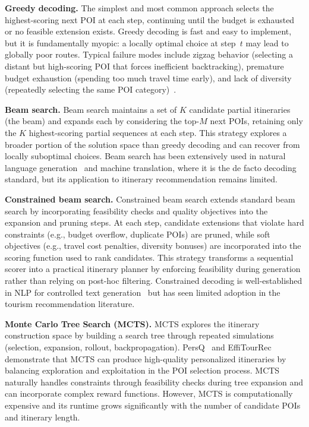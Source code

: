 \textbf{Greedy decoding.} The simplest and most common approach selects the highest-scoring next POI at each step, continuing until the budget is exhausted or no feasible extension exists. Greedy decoding is fast and easy to implement, but it is fundamentally myopic: a locally optimal choice at step~$t$ may lead to globally poor routes. Typical failure modes include zigzag behavior (selecting a distant but high-scoring POI that forces inefficient backtracking), premature budget exhaustion (spending too much travel time early), and lack of diversity (repeatedly selecting the same POI category)~\cite{wu2025trajectory}.

\textbf{Beam search.} Beam search maintains a set of $K$ candidate partial itineraries (the beam) and expands each by considering the top-$M$ next POIs, retaining only the $K$ highest-scoring partial sequences at each step. This strategy explores a broader portion of the solution space than greedy decoding and can recover from locally suboptimal choices. Beam search has been extensively used in natural language generation~\cite{vaswani2017attention} and machine translation, where it is the de facto decoding standard, but its application to itinerary recommendation remains limited.

\textbf{Constrained beam search.} Constrained beam search extends standard beam search by incorporating feasibility checks and quality objectives into the expansion and pruning steps. At each step, candidate extensions that violate hard constraints (e.g., budget overflow, duplicate POIs) are pruned, while soft objectives (e.g., travel cost penalties, diversity bonuses) are incorporated into the scoring function used to rank candidates. This strategy transforms a sequential scorer into a practical itinerary planner by enforcing feasibility during generation rather than relying on post-hoc filtering. Constrained decoding is well-established in NLP for controlled text generation~\cite{hokamp2017lcd, post2018fast} but has seen limited adoption in the tourism recommendation literature.

\textbf{Monte Carlo Tree Search (MCTS).} MCTS explores the itinerary construction space by building a search tree through repeated simulations (selection, expansion, rollout, backpropagation). PersQ~\cite{lim2017persq} and EffiTourRec~\cite{halder2022effitour} demonstrate that MCTS can produce high-quality personalized itineraries by balancing exploration and exploitation in the POI selection process. MCTS naturally handles constraints through feasibility checks during tree expansion and can incorporate complex reward functions. However, MCTS is computationally expensive and its runtime grows significantly with the number of candidate POIs and itinerary length.

